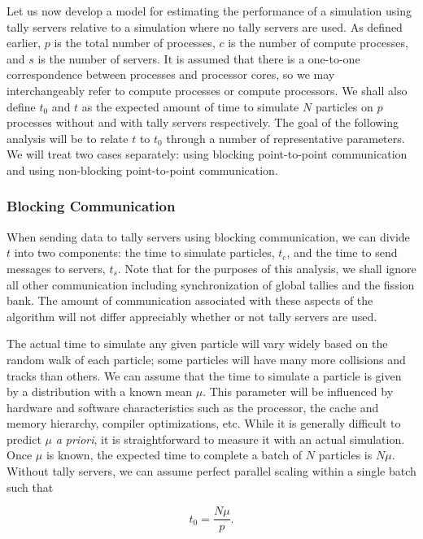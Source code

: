 \documentclass[3p,fleqn]{elsarticle}
\begin{document}
Let us now develop a model for estimating the performance of a simulation using
tally servers relative to a simulation where no tally servers are used. As
defined earlier, $p$ is the total number of processes, $c$ is the number of
compute processes, and $s$ is the number of servers. It is assumed that there is
a one-to-one correspondence between processes and processor cores, so we may
interchangeably refer to compute processes or compute processors. We shall also
define $t_0$ and $t$ as the expected amount of time to simulate $N$ particles on
$p$ processes without and with tally servers respectively. The goal of the
following analysis will be to relate $t$ to $t_0$ through a number of
representative parameters. We will treat two cases separately: using blocking
point-to-point communication and using non-blocking point-to-point
communication.

\subsubsection{Blocking Communication}

When sending data to tally servers using blocking communication, we can divide
$t$ into two components: the time to simulate particles, $t_c$, and the time to
send messages to servers, $t_s$. Note that for the purposes of this analysis, we
shall ignore all other communication including synchronization of global tallies
and the fission bank. The amount of communication associated with these aspects
of the algorithm will not differ appreciably whether or not tally servers are
used.

The actual time to simulate any given particle will vary widely based on the
random walk of each particle; some particles will have many more collisions and
tracks than others. We can assume that the time to simulate a particle is given
by a distribution with a known mean $\mu$. This parameter will be influenced by
hardware and software characteristics such as the processor, the cache and
memory hierarchy, compiler optimizations, etc. While it is generally difficult
to predict $\mu$ \emph{a priori}, it is straightforward to measure it with an
actual simulation. Once $\mu$ is known, the expected time to complete a batch of
$N$ particles is $N\mu$. Without tally servers, we can assume perfect parallel
scaling within a single batch \cite{ane-romano-2013} such that

\begin{equation}
  \label{eq:time-without}
  t_0 = \frac{N\mu}{p}.
\end{equation}
\end{document}
